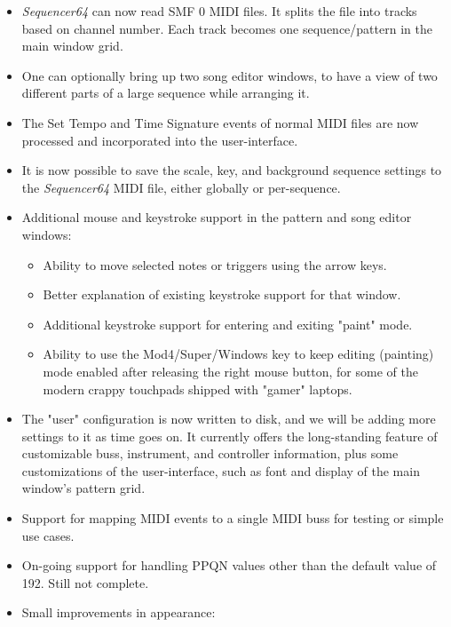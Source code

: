 \documentclass[
 11pt,
 twoside,
 a4paper,
 headinclude,
 footinclude,
 final                                 %
]{article}
\begin{document}
   \begin{itemize}
      \item \textsl{Sequencer64} can now read SMF 0 MIDI files.  It splits
         the file into tracks based on channel number.  Each track becomes one
         sequence/pattern in the main window grid.
      \item One can optionally bring up two song editor windows, to have a view
         of two different parts of a large sequence while arranging it.
      \item The Set Tempo and Time Signature events of normal MIDI files are
         now processed and incorporated into the user-interface.
      \item It is now possible to save the scale, key, and background sequence
         settings to the \textsl{Sequencer64} MIDI file, either globally or
         per-sequence.
      \item Additional mouse and keystroke support in the pattern and song
         editor windows:
      \begin{itemize}
         \item Ability to move selected notes or triggers using the arrow keys.
         \item Better explanation of existing keystroke support for that window.
         \item Additional keystroke support for entering and exiting "paint"
            mode.
         \item Ability to use the Mod4/Super/Windows key to keep editing
            (painting) mode enabled after releasing the right mouse button,
            for some of the modern crappy touchpads shipped with
            "gamer" laptops.
      \end{itemize}
      \item The "user" configuration is now written to disk, and we will be
         adding more settings to it as time goes on.  It currently offers the
         long-standing feature of customizable buss, instrument, and controller
         information, plus some customizations of the user-interface, such as
         font and display of the main window's pattern grid.
      \item Support for mapping MIDI events to a single MIDI buss for testing
         or simple use cases.
      \item On-going support for handling PPQN values other than the
         default value of 192.  Still not complete.
      \item Small improvements in appearance:

\end{itemize}
\end{document}
